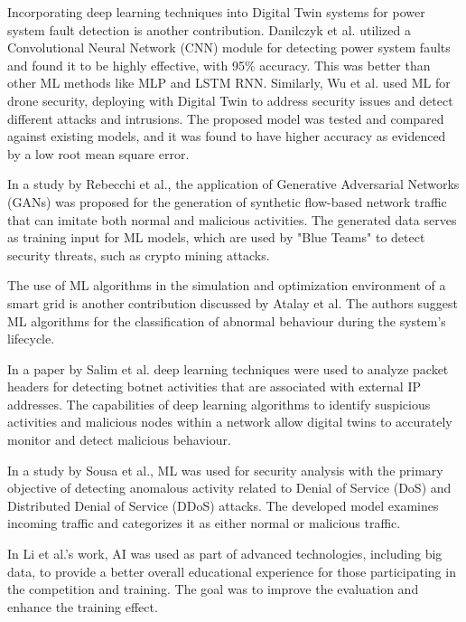 Incorporating deep learning techniques into Digital Twin systems for power system fault detection is another contribution. Danilczyk et al.\cite{danilczykSmartGridAnomaly2021} utilized a Convolutional Neural Network (CNN) module for detecting power system faults and found it to be highly effective, with 95\% accuracy. This was better than other ML methods like MLP and LSTM RNN. Similarly, Wu et al.\cite{wuDeepLearningDriven2022} used ML for drone security, deploying with Digital Twin to address security issues and detect different attacks and intrusions. The proposed model was tested and compared against existing models, and it was found to have higher accuracy as evidenced by a low root mean square error. 

In a study by Rebecchi et al.\cite{rebecchiDigitalTwin5G2022}, the application of Generative Adversarial Networks (GANs) was proposed for the generation of synthetic flow-based network traffic that can imitate both normal and malicious activities. The generated data serves as training input for ML models, which are used by "Blue Teams" to detect security threats, such as crypto mining attacks.

The use of ML algorithms in the simulation and optimization environment of a smart grid is another contribution discussed by Atalay et al.\cite{atalayDigitalTwinsApproach2020} The authors suggest ML algorithms for the classification of abnormal behaviour during the system's lifecycle.

In a paper by Salim et al.\cite{salimBlockchainEnabledSecureDigital2022} deep learning techniques were used to analyze packet headers for detecting botnet activities that are associated with external IP addresses. The capabilities of deep learning algorithms to identify suspicious activities and malicious nodes within a network allow digital twins to accurately monitor and detect malicious behaviour.

In a study by Sousa et al.\cite{sousaELEGANTSecurityCritical2021}, ML was used for security analysis with the primary objective of detecting anomalous activity related to Denial of Service (DoS) and Distributed Denial of Service (DDoS) attacks. The developed model examines incoming traffic and categorizes it as either normal or malicious traffic.

In Li et al.'s\cite{jiaqiliSpaceSpiderHyper2022} work, AI was used as part of advanced technologies, including big data, to provide a better overall educational experience for those participating in the competition and training. The goal was to improve the evaluation and enhance the training effect.

